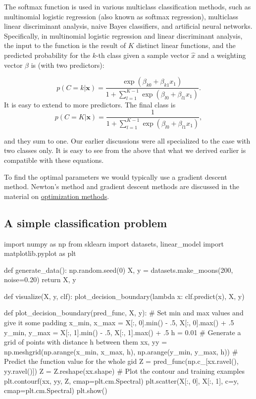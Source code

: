 \documentclass[%
oneside,                 %
final,                   %
10pt]{article}
\begin{document}
The softmax function is used in various multiclass classification
methods, such as multinomial logistic regression (also known as
softmax regression), multiclass linear discriminant analysis, naive
Bayes classifiers, and artificial neural networks.  Specifically, in
multinomial logistic regression and linear discriminant analysis, the
input to the function is the result of $K$ distinct linear functions,
and the predicted probability for the $k$-th class given a sample
vector $\hat{x}$ and a weighting vector $\hat{\beta}$ is (with two
predictors):

\[
p(C=k\vert \mathbf {x} )=\frac{\exp{(\beta_{k0}+\beta_{k1}x_1)}}{1+\sum_{l=1}^{K-1}\exp{(\beta_{l0}+\beta_{l1}x_1)}}.
\]
It is easy to extend to more predictors. The final class is 
\[
p(C=K\vert \mathbf {x} )=\frac{1}{1+\sum_{l=1}^{K-1}\exp{(\beta_{l0}+\beta_{l1}x_1)}},
\]

and they sum to one. Our earlier discussions were all specialized to
the case with two classes only. It is easy to see from the above that
what we derived earlier is compatible with these equations.

To find the optimal parameters we would typically use a gradient
descent method.  Newton's method and gradient descent methods are
discussed in the material on \href{{https://compphysics.github.io/MachineLearning/doc/pub/Splines/html/Splines-bs.html}}{optimization
methods}.




\subsection{A simple classification problem}
\bpycod
import numpy as np
from sklearn import datasets, linear_model
import matplotlib.pyplot as plt


def generate_data():
    np.random.seed(0)
    X, y = datasets.make_moons(200, noise=0.20)
    return X, y


def visualize(X, y, clf):
    plot_decision_boundary(lambda x: clf.predict(x), X, y)

def plot_decision_boundary(pred_func, X, y):
    # Set min and max values and give it some padding
    x_min, x_max = X[:, 0].min() - .5, X[:, 0].max() + .5
    y_min, y_max = X[:, 1].min() - .5, X[:, 1].max() + .5
    h = 0.01
    # Generate a grid of points with distance h between them
    xx, yy = np.meshgrid(np.arange(x_min, x_max, h), np.arange(y_min, y_max, h))
    # Predict the function value for the whole gid
    Z = pred_func(np.c_[xx.ravel(), yy.ravel()])
    Z = Z.reshape(xx.shape)
    # Plot the contour and training examples
    plt.contourf(xx, yy, Z, cmap=plt.cm.Spectral)
    plt.scatter(X[:, 0], X[:, 1], c=y, cmap=plt.cm.Spectral)
    plt.show()
\end{document}
